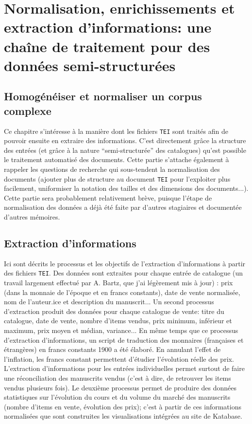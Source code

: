 \documentclass[a4paper, 12pt, twoside]{book}
\newcommand{\tei}{\texttt{TEI}}
\begin{document}
\part{Normalisation, enrichissements et extraction d'informations: une chaîne de traitement pour des données semi-structurées}
\chapter{Homogénéiser et normaliser un corpus complexe}
Ce chapitre s'intéresse à la manière dont les fichiers \tei{} sont traités afin de pouvoir ensuite en extraire des informations. C'est directement grâce la structure des entrées (et grâce à la nature \enquote{semi-structurée} des catalogues) qu'est possible le traitement automatisé des documents. Cette partie s'attache également à rappeler les questions de recherche qui sous-tendent la normalisation des documents (ajouter plus de structure au document \tei{} pour l'exploiter plus facilement, uniformiser la notation des tailles et des dimensions des documents...). Cette partie sera probablement relativement brève, puisque l'étape de normalisation des données a déjà été faite par d'autres stagiaires et documentée d'autres mémoires.

\chapter{Extraction d'informations}
Ici sont décrits le processus et les objectifs de l'extraction d'informations à partir des fichiers \tei{}. Des données sont extraites pour chaque entrée de catalogue (un travail largement effectué par A. Bartz, que j'ai légèrement mis à jour) : prix (dans la monnaie de l'époque et en francs constants), date de vente normalisée, nom de l'auteur.ice et description du manuscrit... Un second processus d'extraction produit des données pour chaque catalogue de vente: titre du catalogue, date de vente, nombre d'items vendus, prix minimum, inférieur et maximum, prix moyen et médian, variance... En même temps que ce processus d'extraction d'informations, un script de traduction des monnaires (françaises et étrangères) en francs constants 1900 a été élaboré. En annulant l'effet de l'inflation, les francs constant permettent d'étudier l'évolution réelle des prix. L'extraction d'informations pour les entrées individuelles permet surtout de faire une réconciliation des manuscrits vendus (c'est à dire, de retrouver les items vendus plusieurs fois). Le deuxième processus permet de produire des données statistiques sur l'évolution du cours et du volume du marché des manuscrits (nombre d'items en vente, évolution des prix); c'est à partir de ces informations normalisées que sont construites les visualisations intégrées au site de Katabase.
\end{document}
